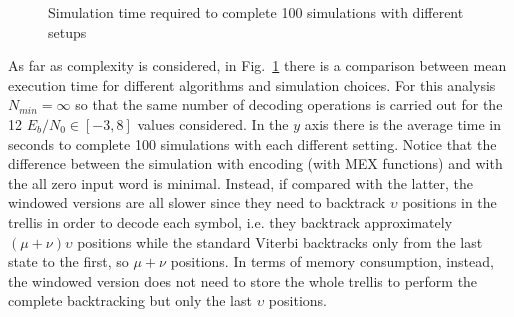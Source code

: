 \documentclass[10pt]{article}
\newlength\fheight
\newlength\fwidth
\begin{document}
\begin{figure}[h!]
\centering
\setlength{}
\setlength{}

\caption{Simulation time required to complete 100 simulations with different setups}
\label{fig:perf}
\end{figure}

As far as complexity is considered, in Fig.~\ref{fig:perf} there is a comparison between mean execution time for different algorithms and simulation choices. 
For this analysis $N_{min} = \infty$ so that the same number of decoding operations is carried out for the 12 $E_b/N_0 \in [-3, 8]$ values considered. 
In the $y$ axis there is the average time in seconds to complete 100 simulations with each different setting. 
Notice that the difference between the simulation with encoding (with MEX functions) and with the all zero input word is minimal. Instead, if compared with the latter, the windowed versions are all slower since they need to backtrack $\upsilon$ positions in the trellis in order to decode each symbol, i.e. they backtrack approximately $(\mu + \nu)\upsilon$ positions while the standard Viterbi backtracks only from the last state to the first, so $\mu+\nu$ positions. In terms of memory consumption, instead, the windowed version does not need to store the whole trellis to perform the complete backtracking but only the last $\upsilon$ positions. 

\begin{figure*}[h]
\centering
{}
\hfil
{}
\hfil
{}
\hfil
{}
\end{figure*}


\clearpage


\end{document}
